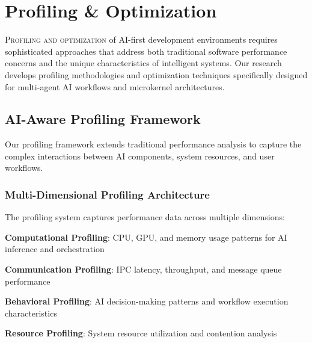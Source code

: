 
\section*{Profiling \& Optimization}

\lettrine{P}{rofiling and optimization} of AI-first development environments requires sophisticated approaches that address both traditional software performance concerns and the unique characteristics of intelligent systems. Our research develops profiling methodologies and optimization techniques specifically designed for multi-agent AI workflows and microkernel architectures.

\subsection*{AI-Aware Profiling Framework}

Our profiling framework extends traditional performance analysis to capture the complex interactions between AI components, system resources, and user workflows.

\subsubsection*{Multi-Dimensional Profiling Architecture}

The profiling system captures performance data across multiple dimensions:

\begin{expandedlist}
    \item \textbf{Computational Profiling}: CPU, GPU, and memory usage patterns for AI inference and orchestration
    \item \textbf{Communication Profiling}: IPC latency, throughput, and message queue performance
    \item \textbf{Behavioral Profiling}: AI decision-making patterns and workflow execution characteristics
    \item \textbf{Resource Profiling}: System resource utilization and contention analysis
\end{expandedlist}

